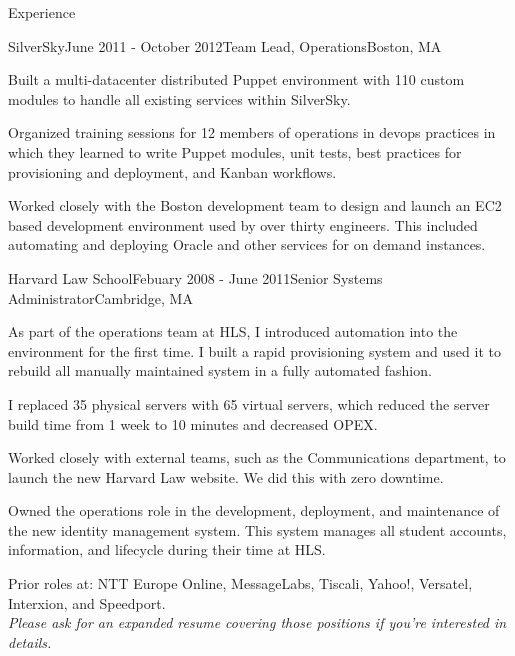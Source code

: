 \documentclass{resume} %
\begin{document}
\begin{rSection}{Experience}
\begin{rSubsection}{SilverSky}{June 2011 - October 2012}{Team Lead, Operations}{Boston, MA}
\item Built a multi-datacenter distributed Puppet environment with 110 custom modules to handle all existing services within SilverSky.
\item Organized training sessions for 12 members of operations in devops practices in which they learned to write Puppet modules, unit tests, best practices for provisioning and deployment, and Kanban workflows.
\item Worked closely with the Boston development team to design and launch an EC2 based development environment used by over thirty engineers.  This included automating and deploying Oracle and other services for on demand instances.
\end{rSubsection}

\begin{rSubsection}{Harvard Law School}{Febuary 2008 - June 2011}{Senior Systems Administrator}{Cambridge, MA}
\item[] As part of the operations team at HLS, I introduced automation into the environment for the first time.  I built a rapid provisioning system and used it to rebuild all manually maintained system in a fully automated fashion.

\item I replaced 35 physical servers with 65 virtual servers, which reduced the server build time from 1 week to 10 minutes and decreased OPEX.
\item Worked closely with external teams, such as the Communications department, to launch the new Harvard Law website.  We did this with zero downtime.
\item Owned the operations role in the development, deployment, and maintenance of the new identity management system. This system manages all student accounts, information, and lifecycle during their time at HLS.
\end{rSubsection}

\begin{center}
Prior roles at: NTT Europe Online, MessageLabs, Tiscali, Yahoo!, Versatel, Interxion, and Speedport.\\
\textit{Please ask for an expanded resume covering those positions if you're interested in details.}
\end{center}

\end{rSection}

\end{document}
